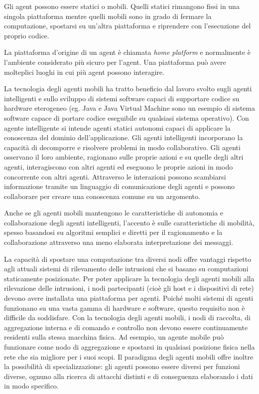 Gli agent possono essere statici o mobili. Quelli statici rimangono fissi in una singola piattaforma mentre quelli mobili sono in grado di fermare la computazione, spostarsi su un'altra piattaforma e riprendere con l'esecuzione del proprio codice.

La piattaforma d'origine di un agent è chiamata \textit{home platform} e normalmente è l'ambiente considerato più sicuro per l'agent.
Una piattaforma può avere molteplici luoghi in cui più agent possono interagire.

La tecnologia degli agenti mobili ha tratto beneficio dal lavoro svolto sugli agenti intelligenti e sullo sviluppo di sistemi software capaci di supportare codice su hardware eterogeneo (eg. Java e Java Virtual Machine sono un esempio di sistema software capace di portare codice eseguibile su qualsiasi sistema operativo). Con agente intelligente si intende  agenti statici autonomi capaci di applicare la conoscenza del dominio dell'applicazione. Gli agenti intelligenti incorporano la capacità di decomporre e risolvere problemi in modo collaborativo. Gli agenti osservano il loro ambiente, ragionano sulle proprie azioni e su quelle degli altri agenti, interagiscono con altri agenti ed eseguono le proprie azioni in modo concorrente con altri agenti.
 Attraverso le interazioni possono scambiarsi informazione tramite un linguaggio di comunicazione degli agenti e possono collaborare per creare una conoscenza comune su un argomento.

Anche se gli agenti mobili mantengono le caratteristiche di autonomia e collaborazione degli agenti intelligenti, l'accento è sulle caratteristiche di mobilità, spesso basandosi su algoritmi semplici e diretti per il ragionamento e la collaborazione attraverso una meno elaborata interpretazione dei messaggi.


La capacità di spostare una computazione tra diversi nodi offre vantaggi rispetto agli attuali sistemi di rilevamento delle intrusioni che si basano su computazioni staticamente posizionate. Per poter applicare la tecnologia degli agenti mobili alla rilevazione delle intrusioni, i nodi partecipanti (cioè gli host e i dispositivi di rete) devono avere installata una piattaforma per agenti. Poiché molti sistemi di agenti funzionano su una vasta gamma di hardware e software, questo requisito non è difficile da soddisfare. Con la tecnologia degli agenti mobili, i nodi di raccolta, di aggregazione interna e di comando e controllo non devono essere continuamente residenti sulla stessa macchina fisica. Ad esempio, un agente mobile può funzionare come nodo di aggregazione e spostarsi in qualsiasi posizione fisica nella rete che sia migliore per i suoi scopi. Il paradigma degli agenti mobili offre inoltre la possibilità di specializzazione: gli agenti possono essere diversi per funzioni diverse, ognuno alla ricerca di attacchi distinti e di conseguenza elaborando i dati in modo specifico.


